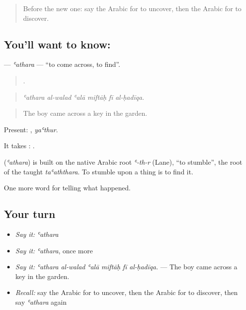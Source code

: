 \label{lesson:AR-C312-athara-find}



\begin{quote}
Before the new one: say the Arabic for to uncover, then the Arabic for to discover.
\end{quote}

\subsection*{You'll want to know: }
\textbf{} — \emph{ʿathara} — \textquotedblleft{}to come across, to find\textquotedblright{}.

\begin{quote}
     .
\end{quote}

\begin{quote}
\emph{ʿathara al-walad ʿalā miftāḥ fī al-ḥadīqa.}
\end{quote}

\begin{quote}
The boy came across a key in the garden.
\end{quote}

Present: , \emph{yaʿthur}.

It takes :  .

\begin{cousinweb}
\textbf{} (\emph{ʿathara}) is built on the native Arabic root \emph{ʿ-th-r} (Lane), \textquotedblleft{}to stumble\textquotedblright{}, the root of the taught \emph{taʿaththara}. To stumble upon a thing is to find it.
\end{cousinweb}

\begin{grammarlens}[title={What you've built}]
One more word for telling what happened.
\end{grammarlens}

\subsection*{Your turn}
\begin{itemize}
\raggedright
  \item \emph{Say it:} \emph{ʿathara}
  \item \emph{Say it:} \emph{ʿathara}, once more
  \item \emph{Say it:} \emph{ʿathara al-walad ʿalā miftāḥ fī al-ḥadīqa.} — The boy came across a key in the garden.
  \item \emph{Recall:} say the Arabic for to uncover, then the Arabic for to discover, then say \emph{ʿathara} again
\end{itemize}

